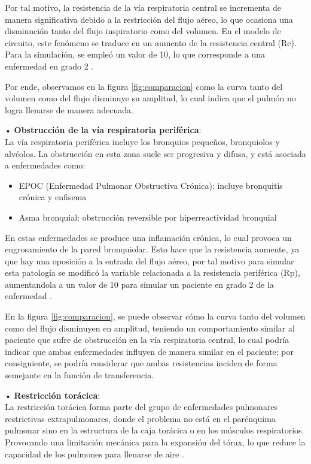 \documentclass[journal]{IEEEtran}
\begin{document}
Por tal motivo, la resistencia de la vía respiratoria central se incrementa de manera significativa debido a la restricción del flujo aéreo, lo que ocasiona una disminución tanto del flujo inspiratorio como del volumen. En el modelo de circuito, este fenómeno se traduce en un aumento de la resistencia central (Rc). Para la simulación, se empleó un valor de 10, lo que corresponde a una enfermedad en grado 2 \cite{nguyen2010respiratory}.

Por ende, observamos en la figura \ref{fig:comparacion} como la curva tanto del volumen como del flujo disminuye su amplitud, lo cual indica que el pulmón no logra llenarse de manera adecuada. \bigskip

•	\textbf{Obstrucción de la vía respiratoria periférica}:\\
La vía respiratoria periférica incluye los bronquios pequeños, bronquiolos y alvéolos. La obstrucción en esta zona suele ser progresiva y difusa, y está asociada a enfermedades como:
\begin{itemize}
    \item EPOC (Enfermedad Pulmonar Obstructiva Crónica): incluye bronquitis crónica y enfisema \cite{nguyen2010respiratory}\cite{contreras2000epoc}
    \item Asma bronquial: obstrucción reversible por hiperreactividad bronquial \cite{nguyen2010respiratory}
\end{itemize}

En estas enfermedades se produce una inflamación crónica, lo cual provoca un engrosamiento de la pared bronquiolar. Esto hace que la resistencia aumente, ya que hay una oposición a la entrada del flujo aéreo, por tal motivo para simular esta patología se modificó la variable relacionada a la resistencia periférica (Rp), aumentandola a un valor de 10 para simular un paciente en grado 2 de la enfermedad \cite{nguyen2010respiratory}\cite{contreras2000epoc}. 

En la figura \ref{fig:comparacion}, se puede observar cómo la curva tanto del volumen como del flujo disminuyen en amplitud, teniendo un comportamiento similar al paciente que sufre de obstrucción en la vía respiratoria central, lo cual podría indicar que ambas enfermedades influyen de manera similar en el paciente; por consiguiente, se podría considerar que ambas resistencias inciden de forma semejante en la función de transferencia. \bigskip

•	\textbf{Restricción torácica}:\\
La restricción torácica forma parte del grupo de enfermedades pulmonares restrictivas extrapulmonares, donde el problema no está en el parénquima pulmonar sino en la estructura de la caja torácica o en los músculos respiratorios. Provocando una limitación mecánica para la expansión del tórax, lo que reduce la capacidad de los pulmones para llenarse de aire \cite{resmed2025restrictive}. 
\end{document}
